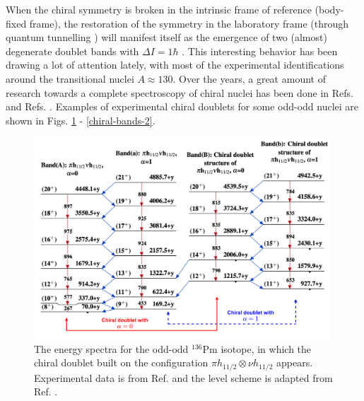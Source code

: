 When the chiral symmetry is broken in the intrinsic frame of reference (body-fixed frame), the restoration of the symmetry in the laboratory frame (through quantum tunnelling \cite{zhang2007chiral}) will manifest itself as the emergence of two (almost) degenerate doublet bands with $\Delta I=1\hbar$ \cite{frauendorf1997tilted}. This interesting behavior has been drawing a lot of attention lately, with most of the experimental identifications around the transitional nuclei $A\approx 130$. Over the years, a great amount of research towards a complete spectroscopy of chiral nuclei has been done in Refs. \cite{starosta2001chiral,meng2008chiral,budaca2018semiclassical,budaca2021chiral} and Refs. \cite{raduta2014new, raduta2014description, raduta2015semi, raduta2015possible, raduta2016specific, raduta2017alternative}. Examples of experimental chiral doublets for some odd-odd nuclei are shown in Figs. \ref{chiral-bands-1} - \ref{chiral-bands-2}.
\begin{figure}
    \centering
    \includegraphics[width=0.99\textwidth]{Chapters/Figures/Chiral_136Pm.pdf}
    \caption{The energy spectra for the odd-odd $^{136}$Pm isotope, in which the chiral doublet built on the configuration $\pi h_{11/2}\otimes\nu h_{11/2}$ appears. Experimental data is from Ref. \cite{mccutchan2018nuclear} and the level scheme is adapted from Ref. \cite{bhat1992evaluated}.}
    \label{chiral-bands-1}
\end{figure}
